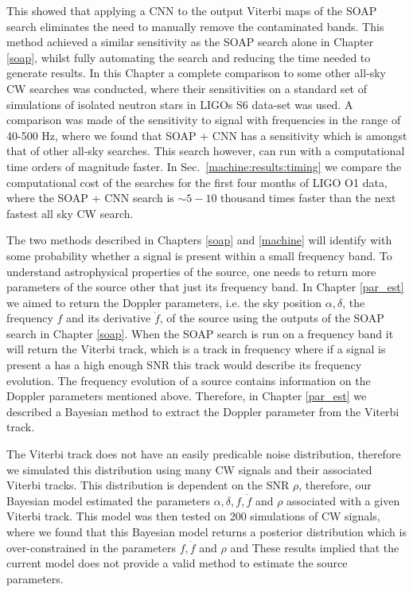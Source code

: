 This showed that applying a \gls{CNN} to the output Viterbi maps of the SOAP search eliminates the need to manually remove the contaminated bands.
This method achieved a similar sensitivity as the SOAP search alone in Chapter \ref{soap}, whilst fully automating the search and reducing the time needed to generate results.
In this Chapter a complete comparison to some other all-sky \gls{CW} searches was conducted, where their sensitivities on a standard set of simulations of isolated neutron stars in \glspl{LIGO} S6 data-set was used.
A comparison was made of the sensitivity to signal with frequencies in the range of 40-500 Hz, where we found that SOAP + \gls{CNN} has a sensitivity which is amongst that of other all-sky searches.
This search however, can run with a computational time orders of magnitude faster. In Sec.~\ref{machine:results:timing} we compare the computational cost of the searches for the first four months of \gls{LIGO} O1 data, where the SOAP + \gls{CNN} search is $\sim 5 - 10$ thousand times faster than the next fastest all sky \gls{CW} search.

\bigskip

The two methods described in Chapters \ref{soap} and \ref{machine} will identify with some probability whether a signal is present within a small frequency band.
To understand astrophysical properties of the source, one needs to return more parameters of the source other that just its frequency band.
In Chapter \ref{par_est} we aimed to return the Doppler parameters, i.e. the sky position $\alpha, \delta$, the frequency $f$ and its derivative $\dot{f}$, of the source using the outputs of the SOAP search in Chapter \ref{soap}.
When the SOAP search is run on a frequency band it will return the Viterbi track, which is a track in frequency where if a signal is present a has a high enough \gls{SNR} this track would describe its frequency evolution.
The frequency evolution of a source contains information on the Doppler parameters mentioned above. 
Therefore, in Chapter \ref{par_est} we described a Bayesian method to extract the Doppler parameter from the Viterbi track.

The Viterbi track does not have an easily predicable noise distribution, therefore we simulated this distribution using many \gls{CW} signals and their associated Viterbi tracks.
This distribution is dependent on the \gls{SNR} $\rho$, therefore, our Bayesian model estimated the parameters $\alpha, \delta, f, \dot{f}$ and $\rho$ associated with a given Viterbi track.
This model was then tested on 200 simulations of \gls{CW} signals, where we found that this Bayesian model returns a posterior distribution which is over-constrained in the parameters $f,\dot{f}$ and $\rho$ and 
These results implied that the current model does not provide a valid method to estimate the source parameters.


